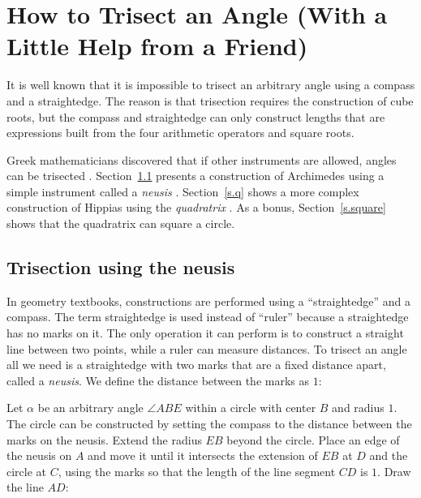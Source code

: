 
\chapter{How to Trisect an Angle (With a Little Help from a Friend)}\label{c.trisect}

It is well known that it is impossible to trisect an arbitrary angle using a compass and a straightedge. The reason is that trisection requires the construction of cube roots, but the compass and straightedge can only construct lengths that are expressions built from the four arithmetic operators and square roots.

Greek mathematicians discovered that if other instruments are allowed, angles can be trisected \cite{wiki:tri}. Section~\ref{s.neusis} presents a construction of Archimedes using a simple instrument called a \emph{neusis} \cite{wiki:neu}. Section~\ref{s.q} shows a more complex construction of Hippias using the \emph{quadratrix} \cite{wiki:quad}. As a bonus, Section~\ref{s.square} shows that the quadratrix can square a circle.


\section{Trisection using the neusis}\label{s.neusis}

In geometry textbooks, constructions are performed using a ``straightedge'' and a compass. The term straightedge is used instead of ``ruler'' because a straightedge has no marks on it. The only operation it can perform is to construct a straight line between two points, while a ruler can measure distances. To trisect an angle all we need is a straightedge with two marks that are a fixed distance apart, called a \emph{neusis}. We define the distance between the marks as $1$:
\begin{center}
\end{center}

Let $\alpha$ be an arbitrary angle $\angle ABE$ within a circle with center $B$ and radius $1$. The circle can be constructed by setting the compass to the distance between the marks on the neusis. Extend the radius $EB$ beyond the circle. Place an edge of the neusis on $A$ and move it until it intersects the extension of $EB$ at $D$ and the circle at $C$, using the marks so that the length of the line segment $CD$ is $1$. Draw the line $AD$:

